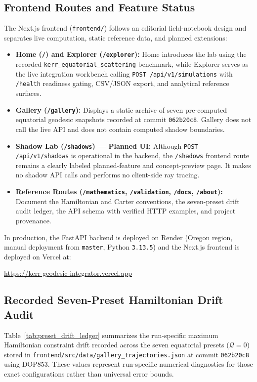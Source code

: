 \subsection{Frontend Routes and Feature Status}
The Next.js frontend (\texttt{frontend/}) follows an editorial field-notebook design and separates live computation, static reference data, and planned extensions:
\begin{itemize}
    \item \textbf{Home (\texttt{/}) and Explorer (\texttt{/explorer}):} Home introduces the lab using the recorded \texttt{kerr\_equatorial\_scattering} benchmark, while Explorer serves as the live integration workbench calling \texttt{POST /api/v1/simulations} with \texttt{/health} readiness gating, CSV/JSON export, and analytical reference surfaces.
    \item \textbf{Gallery (\texttt{/gallery}):} Displays a static archive of seven pre-computed equatorial geodesic snapshots recorded at commit \texttt{062b20c8}. Gallery does not call the live API and does not contain computed shadow boundaries.
    \item \textbf{Shadow Lab (\texttt{/shadows}) --- Planned UI:} Although \texttt{POST /api/v1/shadows} is operational in the backend, the \texttt{/shadows} frontend route remains a clearly labeled planned-feature and concept-preview page. It makes no shadow API calls and performs no client-side ray tracing.
    \item \textbf{Reference Routes (\texttt{/mathematics}, \texttt{/validation}, \texttt{/docs}, \texttt{/about}):} Document the Hamiltonian and Carter conventions, the seven-preset drift audit ledger, the API schema with verified HTTP examples, and project provenance.
\end{itemize}
In production, the FastAPI backend is deployed on Render (Oregon region, manual deployment from \texttt{master}, Python \texttt{3.13.5}) and the Next.js frontend is deployed on Vercel at:
\begin{center}
\url{https://kerr-geodesic-integrator.vercel.app}
\end{center}

\subsection{Recorded Seven-Preset Hamiltonian Drift Audit}
Table~\ref{tab:preset_drift_ledger} summarizes the run-specific maximum Hamiltonian constraint drift recorded across the seven equatorial presets ($\mathcal{Q} = 0$) stored in \texttt{frontend/src/data/gallery\_trajectories.json} at commit \texttt{062b20c8} using \textsc{DOP853}. These values represent run-specific numerical diagnostics for those exact configurations rather than universal error bounds.

